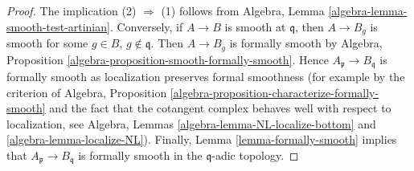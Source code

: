 \documentclass[10pt,a4paper]{amsart}
\theoremstyle{plain}
\theoremstyle{definition}
\theoremstyle{remark}
\numberwithin{equation}{subsection}
\begin{document}
\begin{proof}
The implication (2) $\Rightarrow$ (1) follows from
Algebra, Lemma \ref{algebra-lemma-smooth-test-artinian}.
Conversely, if $A \to B$ is smooth at $\mathfrak q$, then
$A \to B_g$ is smooth for some $g \in B$, $g \not \in \mathfrak q$.
Then $A \to B_g$ is formally smooth by
Algebra, Proposition \ref{algebra-proposition-smooth-formally-smooth}.
Hence $A_\mathfrak p \to B_\mathfrak q$ is formally smooth
as localization preserves formal smoothness (for example by
the criterion of Algebra, Proposition
\ref{algebra-proposition-characterize-formally-smooth}
and the fact that the cotangent complex behaves well with respect to
localization, see
Algebra, Lemmas \ref{algebra-lemma-NL-localize-bottom} and
\ref{algebra-lemma-localize-NL}).
Finally, Lemma \ref{lemma-formally-smooth} implies that
$A_\mathfrak p \to B_\mathfrak q$ is formally smooth in the
$\mathfrak q$-adic topology.
\end{proof}
\end{document}

